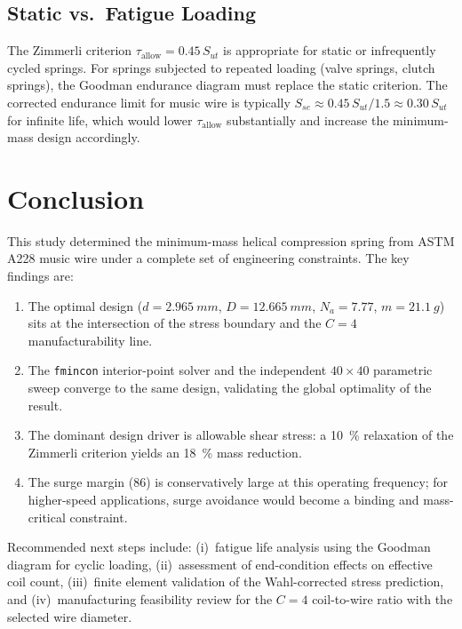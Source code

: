 \documentclass[10pt,twocolumn]{article}
\begin{document}
\subsection{Static vs.\ Fatigue Loading}

The Zimmerli criterion $\tau_{\text{allow}} = 0.45\,S_{ut}$ is appropriate
for static or infrequently cycled springs.
For springs subjected to repeated loading (valve springs, clutch springs),
the Goodman endurance diagram must replace the static criterion.
The corrected endurance limit for music wire is typically
$S_{se} \approx 0.45\,S_{ut} / 1.5 \approx 0.30\,S_{ut}$ for infinite life,
which would lower $\tau_{\text{allow}}$ substantially and increase the
minimum-mass design accordingly.

\section{Conclusion}

This study determined the minimum-mass helical compression spring from
ASTM A228 music wire under a complete set of engineering constraints.
The key findings are:

\begin{enumerate}[leftmargin=*,label=\arabic*.]
  \item The optimal design ($d = \SI{2.965}{mm}$, $D = \SI{12.665}{mm}$,
    $N_a = 7.77$, $m = \SI{21.1}{g}$) sits at the intersection of the
    stress boundary and the $C = 4$ manufacturability line.
  \item The \texttt{fmincon} interior-point solver and the independent
    $40\times40$ parametric sweep converge to the same design, validating
    the global optimality of the result.
  \item The dominant design driver is allowable shear stress: a
    \SI{10}{\percent} relaxation of the Zimmerli criterion yields an
    \SI{18}{\percent} mass reduction.
  \item The surge margin (\SI{86}{\times}) is conservatively large at this
    operating frequency; for higher-speed applications, surge avoidance
    would become a binding and mass-critical constraint.
\end{enumerate}

Recommended next steps include: (i)~fatigue life analysis using the
Goodman diagram for cyclic loading, (ii)~assessment of end-condition effects
on effective coil count, (iii)~finite element validation of the
Wahl-corrected stress prediction, and (iv)~manufacturing feasibility review
for the $C = 4$ coil-to-wire ratio with the selected wire diameter.
\end{document}

